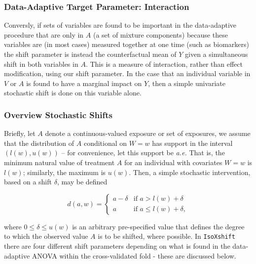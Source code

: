 \documentclass[
]{article}
\begin{document}
\hypertarget{data-adaptive-target-parameter-interaction}{%
\subsubsection{Data-Adaptive Target Parameter:
Interaction}\label{data-adaptive-target-parameter-interaction}}

Conversly, if sets of variables are found to be important in the
data-adaptive procedure that are only in \(A\) (a set of mixture
components) because these variables are (in most cases) measured
together at one time (such as biomarkers) the shift parameter is instead
the counterfactual mean of \(Y\) given a simultaneous shift in both
variables in \(A\). This is a measure of interaction, rather than effect
modification, using our shift parameter. In the case that an individual
variable in \(V\) or \(A\) is found to have a marginal impact on \(Y\),
then a simple univariate stochastic shift is done on this variable
alone.

\hypertarget{overview-stochastic-shifts}{%
\subsubsection{Overview Stochastic
Shifts}\label{overview-stochastic-shifts}}

Briefly, let \(A\) denote a continuous-valued exposure or set of
exposures, we assume that the distribution of \(A\) conditional on
\(W = w\) has support in the interval \((l(w), u(w))\) -- for
convenience, let this support be \emph{a.e.} That is, the minimum
natural value of treatment \(A\) for an individual with covariates
\(W = w\) is \(l(w)\); similarly, the maximum is \(u(w)\). Then, a
simple stochastic intervention, based on a shift \(\delta\), may be
defined

\begin{equation}\label{eqn:shift}
  d(a, w) =
  \begin{cases}
    a - \delta & \text{if } a > l(w) + \delta \\
    a & \text{if } a \leq l(w) + \delta,
  \end{cases}
\end{equation}

where \(0 \leq \delta \leq u(w)\) is an arbitrary pre-specified value
that defines the degree to which the observed value \(A\) is to be
shifted, where possible. In \texttt{IsoXshift} there are four different
shift parameters depending on what is found in the data-adaptive ANOVA
within the cross-validated fold - these are discussed below.
\end{document}
